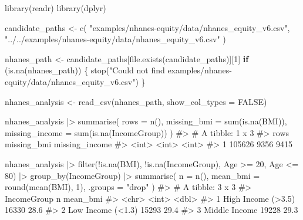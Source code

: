 \documentclass[
  letterpaper,
  DIV=11,
  numbers=noendperiod,
  oneside]{scrreprt}
\newenvironment{Shaded}{\begin{snugshade}}{\end{snugshade}}
\newcommand{\AttributeTok}[1]{\textcolor[rgb]{0.40,0.45,0.13}{#1}}
\newcommand{\CommentTok}[1]{\textcolor[rgb]{0.37,0.37,0.37}{#1}}
\newcommand{\ConstantTok}[1]{\textcolor[rgb]{0.56,0.35,0.01}{#1}}
\newcommand{\ControlFlowTok}[1]{\textcolor[rgb]{0.00,0.23,0.31}{\textbf{#1}}}
\newcommand{\DecValTok}[1]{\textcolor[rgb]{0.68,0.00,0.00}{#1}}
\newcommand{\FunctionTok}[1]{\textcolor[rgb]{0.28,0.35,0.67}{#1}}
\newcommand{\NormalTok}[1]{\textcolor[rgb]{0.00,0.23,0.31}{#1}}
\newcommand{\OtherTok}[1]{\textcolor[rgb]{0.00,0.23,0.31}{#1}}
\newcommand{\SpecialCharTok}[1]{\textcolor[rgb]{0.37,0.37,0.37}{#1}}
\newcommand{\StringTok}[1]{\textcolor[rgb]{0.13,0.47,0.30}{#1}}
\begin{document}
\begin{Shaded}
\begin{Highlighting}[numbers=left,,]
\FunctionTok{library}\NormalTok{(readr)}
\FunctionTok{library}\NormalTok{(dplyr)}

\NormalTok{candidate\_paths }\OtherTok{\textless{}{-}} \FunctionTok{c}\NormalTok{(}
  \StringTok{"examples/nhanes{-}equity/data/nhanes\_equity\_v6.csv"}\NormalTok{,}
  \StringTok{"../../examples/nhanes{-}equity/data/nhanes\_equity\_v6.csv"}
\NormalTok{)}

\NormalTok{nhanes\_path }\OtherTok{\textless{}{-}}\NormalTok{ candidate\_paths[}\FunctionTok{file.exists}\NormalTok{(candidate\_paths)][}\DecValTok{1}\NormalTok{]}
\ControlFlowTok{if}\NormalTok{ (}\FunctionTok{is.na}\NormalTok{(nhanes\_path)) \{}
  \FunctionTok{stop}\NormalTok{(}\StringTok{"Could not find examples/nhanes{-}equity/data/nhanes\_equity\_v6.csv"}\NormalTok{)}
\NormalTok{\}}

\NormalTok{nhanes\_analysis }\OtherTok{\textless{}{-}} \FunctionTok{read\_csv}\NormalTok{(nhanes\_path, }\AttributeTok{show\_col\_types =} \ConstantTok{FALSE}\NormalTok{)}

\NormalTok{nhanes\_analysis }\SpecialCharTok{|\textgreater{}}
  \FunctionTok{summarise}\NormalTok{(}
    \AttributeTok{rows =} \FunctionTok{n}\NormalTok{(),}
    \AttributeTok{missing\_bmi =} \FunctionTok{sum}\NormalTok{(}\FunctionTok{is.na}\NormalTok{(BMI)),}
    \AttributeTok{missing\_income =} \FunctionTok{sum}\NormalTok{(}\FunctionTok{is.na}\NormalTok{(IncomeGroup))}
\NormalTok{  )}
\CommentTok{\#\textgreater{} \# A tibble: 1 x 3}
\CommentTok{\#\textgreater{}     rows missing\_bmi missing\_income}
\CommentTok{\#\textgreater{}    \textless{}int\textgreater{}       \textless{}int\textgreater{}          \textless{}int\textgreater{}}
\CommentTok{\#\textgreater{} 1 105626        9356           9415}

\NormalTok{nhanes\_analysis }\SpecialCharTok{|\textgreater{}}
  \FunctionTok{filter}\NormalTok{(}\SpecialCharTok{!}\FunctionTok{is.na}\NormalTok{(BMI), }\SpecialCharTok{!}\FunctionTok{is.na}\NormalTok{(IncomeGroup), Age }\SpecialCharTok{\textgreater{}=} \DecValTok{20}\NormalTok{, Age }\SpecialCharTok{\textless{}=} \DecValTok{80}\NormalTok{) }\SpecialCharTok{|\textgreater{}}
  \FunctionTok{group\_by}\NormalTok{(IncomeGroup) }\SpecialCharTok{|\textgreater{}}
  \FunctionTok{summarise}\NormalTok{(}
    \AttributeTok{n =} \FunctionTok{n}\NormalTok{(),}
    \AttributeTok{mean\_bmi =} \FunctionTok{round}\NormalTok{(}\FunctionTok{mean}\NormalTok{(BMI), }\DecValTok{1}\NormalTok{),}
    \AttributeTok{.groups =} \StringTok{"drop"}
\NormalTok{  )}
\CommentTok{\#\textgreater{} \# A tibble: 3 x 3}
\CommentTok{\#\textgreater{}   IncomeGroup            n mean\_bmi}
\CommentTok{\#\textgreater{}   \textless{}chr\textgreater{}              \textless{}int\textgreater{}    \textless{}dbl\textgreater{}}
\CommentTok{\#\textgreater{} 1 High Income (\textgreater{}3.5) 16330     28.6}
\CommentTok{\#\textgreater{} 2 Low Income (\textless{}1.3)  15293     29.4}
\CommentTok{\#\textgreater{} 3 Middle Income      19228     29.3}
\end{Highlighting}
\end{Shaded}
\end{document}
